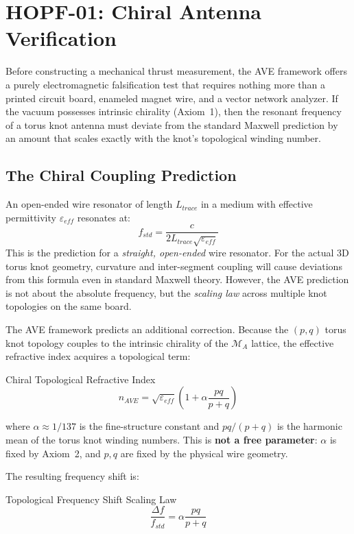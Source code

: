 \chapter{HOPF-01: Chiral Antenna Verification}
\label{ch:hopf_01}

Before constructing a mechanical thrust measurement, the AVE framework offers a purely electromagnetic falsification test that requires nothing more than a printed circuit board, enameled magnet wire, and a vector network analyzer. If the vacuum possesses intrinsic chirality (Axiom~1), then the resonant frequency of a torus knot antenna must deviate from the standard Maxwell prediction by an amount that scales exactly with the knot's topological winding number.

\section{The Chiral Coupling Prediction}

An open-ended wire resonator of length $L_{trace}$ in a medium with effective permittivity $\varepsilon_{eff}$ resonates at:
\begin{equation}
    f_{std} = \frac{c}{2 L_{trace} \sqrt{\varepsilon_{eff}}}
\end{equation}
This is the prediction for a \textit{straight, open-ended} wire resonator. For the actual 3D torus knot geometry, curvature and inter-segment coupling will cause deviations from this formula even in standard Maxwell theory. However, the AVE prediction is not about the absolute frequency, but the \textit{scaling law} across multiple knot topologies on the same board.

The AVE framework predicts an additional correction. Because the $(p,q)$ torus knot topology couples to the intrinsic chirality of the $\mathcal{M}_A$ lattice, the effective refractive index acquires a topological term:
\begin{resultbox}{Chiral Topological Refractive Index}
\begin{equation}
    n_{AVE} = \sqrt{\varepsilon_{eff}}\left(1 + \alpha \frac{pq}{p+q}\right)
    \label{eq:n_ave}
\end{equation}
\end{resultbox}
where $\alpha \approx 1/137$ is the fine-structure constant and $pq/(p+q)$ is the harmonic mean of the torus knot winding numbers. This is \textbf{not a free parameter}: $\alpha$ is fixed by Axiom~2, and $p,q$ are fixed by the physical wire geometry.

The resulting frequency shift is:
\begin{resultbox}{Topological Frequency Shift Scaling Law}
\begin{equation}
    \frac{\Delta f}{f_{std}} = \alpha \frac{pq}{p+q}
\end{equation}
\end{resultbox}

